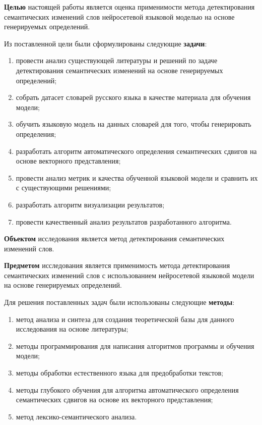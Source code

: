 \documentclass[LI,VKR]{HSEUniversity}
\begin{document}
\textbf{Целью} настоящей работы является оценка применимости метода детектирования семантических
изменений слов нейросетевой языковой моделью на основе генерируемых определений.

Из поставленной цели были сформулированы следующие \textbf{задачи}:
\begin{enumerate}
    \item провести анализ существующей литературы и решений по задаче детектирования семантических
    изменений на основе генерируемых определений;
    \item собрать датасет словарей русского языка в качестве материала для обучения модели;
    \item обучить языковую модель на данных словарей для того, чтобы генерировать определения;
    \item разработать алгоритм автоматического определения семантических сдвигов на
основе векторного представления;
    \item провести анализ метрик и качества обученной языковой модели и сравнить их с
    существующими решениями;
    \item разработать алгоритм визуализации результатов;
    \item провести качественный анализ результатов разработанного алгоритма.
\end{enumerate}

\textbf{Объектом} исследования является метод детектирования семантических изменений слов.

\textbf{Предметом} исследования является применимость метода детектирования семантических изменений
слов с использованием нейросетевой языковой модели на основе генерируемых определений.

Для решения поставленных задач были использованы следующие \textbf{методы}:
\begin{enumerate}
    \item метод анализа и синтеза для создания теоретической базы для данного исследования
на основе литературы;
    \item методы программирования для написания алгоритмов программы и обучения модели;
    \item методы обработки естественного языка для предобработки текстов;
    \item методы глубокого обучения для алгоритма автоматического определения семантических
сдвигов на основе их векторного представления;
    \item метод лексико-семантического анализа. %
\end{enumerate}
\end{document}
